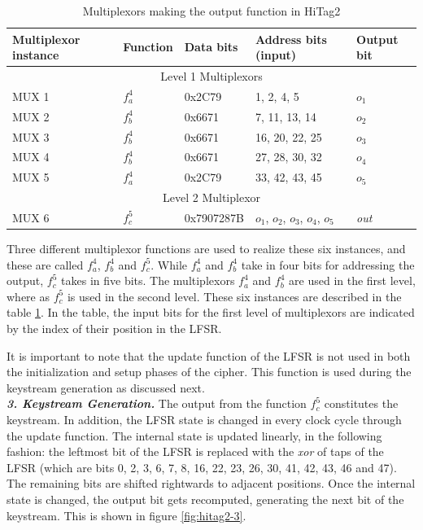 \begin{table}[ht!]
\begin{center}
\small{
\begin{tabular}{|p{2.2cm}|l|p{2cm}|p{2.8cm}|p{1.5cm}|}
\hline 
\textbf{Multiplexor instance}	& \textbf{Function}		& \textbf{Data bits}	& \textbf{Address bits (input)}		& \textbf{Output bit}\\ \hline \hline
\multicolumn{5}{|c|}{Level 1 Multiplexors}\\ \hline \hline
MUX 1 			&	$f_a^4$			& 0x2C79			& 1, 2, 4, 5							& $o_1$\\
MUX 2 			&	$f_b^4$			& 0x6671			& 7, 11, 13, 14						& $o_2$\\
MUX 3 			&	$f_b^4$			& 0x6671			& 16, 20, 22, 25					& $o_3$\\
MUX 4 			&	$f_b^4$			& 0x6671			& 27, 28, 30, 32					& $o_4$\\
MUX 5 			&	$f_a^4$			& 0x2C79			& 33, 42, 43, 45					& $o_5$\\ \hline \hline
\multicolumn{5}{|c|}{Level 2 Multiplexor}\\ \hline \hline
MUX 6 			&	$f_c^5$			& 0x7907287B	& $o_1$, $o_2$, $o_3$, $o_4$, $o_5$		& \textit{out}\\ \hline
\end{tabular}}
\end{center}
\caption{Multiplexors making the output function in HiTag2}
\label{tab:muxs}
\end{table}

Three different multiplexor functions are used to realize these six instances, and these are called $f_a^4$, $f_b^4$ and $f_c^5$. While $f_a^4$ and $f_b^4$ take in four bits for addressing the output, $f_c^5$ takes in five bits. The multiplexors $f_a^4$ and $f_b^4$ are used in the first level, where as $f_c^5$ is used in the second level. These six instances are described in the table \ref{tab:muxs}. In the table, the input bits for the first level of multiplexors are indicated by the index of their position in the LFSR.

It is important to note that the update function of the LFSR is not used in both the initialization and setup phases of the cipher. This function is used during the keystream generation as discussed next.\\

\noindent \textit{\textbf{3. Keystream Generation.}} The output from the function $f_c^5$ constitutes the keystream. In addition, the LFSR state is changed in every clock cycle through the update function. The internal state is updated linearly, in the following fashion: the leftmost bit of the LFSR is replaced with the \textit{xor} of taps of the LFSR (which are bits 0, 2, 3, 6, 7, 8, 16, 22, 23, 26, 30, 41, 42, 43, 46 and 47). The remaining bits are shifted rightwards to adjacent positions. Once the internal state is changed, the output bit gets recomputed, generating the next bit of the keystream. This is shown in figure \ref{fig:hitag2-3}. 

